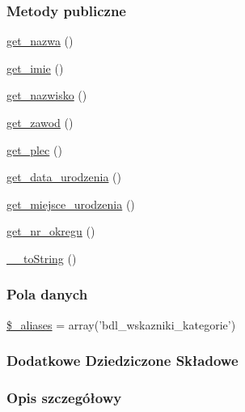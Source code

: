 \subsubsection*{Metody publiczne}
\begin{DoxyCompactItemize}
\item 
\hyperlink{classep___b_d_l___kategoria_ac0818f0049d7b84f08f77128f54cee36}{get\-\_\-nazwa} ()
\item 
\hyperlink{classep___b_d_l___kategoria_ac4b0c85dc2a130038f2d118dbd0c3d77}{get\-\_\-imie} ()
\item 
\hyperlink{classep___b_d_l___kategoria_abdd1d7ff92508da7f748ba1feec97af0}{get\-\_\-nazwisko} ()
\item 
\hyperlink{classep___b_d_l___kategoria_af80ca8310b60004454dd02a387deaa2c}{get\-\_\-zawod} ()
\item 
\hyperlink{classep___b_d_l___kategoria_ac7f9af5c3fa024e4c26a7b6bd4ce4bb4}{get\-\_\-plec} ()
\item 
\hyperlink{classep___b_d_l___kategoria_a880b240cd2d8c336fd1709bf0cb1ae2c}{get\-\_\-data\-\_\-urodzenia} ()
\item 
\hyperlink{classep___b_d_l___kategoria_ac57c08ec5e394a19c5bd9280c8376182}{get\-\_\-miejsce\-\_\-urodzenia} ()
\item 
\hyperlink{classep___b_d_l___kategoria_a2645a9f0aa5b0ccc482943348c033d0a}{get\-\_\-nr\-\_\-okregu} ()
\item 
\hyperlink{classep___b_d_l___kategoria_a7516ca30af0db3cdbf9a7739b48ce91d}{\-\_\-\-\_\-to\-String} ()
\end{DoxyCompactItemize}
\subsubsection*{Pola danych}
\begin{DoxyCompactItemize}
\item 
\hyperlink{classep___b_d_l___kategoria_ab4e31d75f0bc5d512456911e5d01366b}{\$\-\_\-aliases} = array('bdl\-\_\-wskazniki\-\_\-kategorie')
\end{DoxyCompactItemize}
\subsubsection*{Dodatkowe Dziedziczone Składowe}


\subsubsection{Opis szczegółowy}


